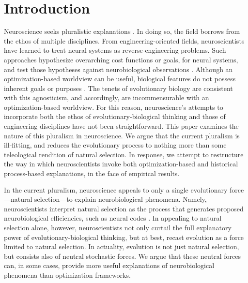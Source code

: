 \documentclass[twocolumn]{article}
\begin{document}

     

\section{Introduction}
Neuroscience seeks pluralistic explanations \cite{mayr_1961, tinbergen_1963, Krakauer:2017ie, hladky_2013}. In doing so, the field borrows from the ethos of multiple disciplines. From engineering-oriented fields, neuroscientists have learned to treat neural systems as reverse-engineering problems. Such approaches hypothesize overarching cost functions or goals, for neural systems, and test those hypotheses against neurobiological observations \cite{marr2010vision, Barlow_1961}.  Although an optimization-based worldview can be useful, biological features do not possess inherent goals or purposes \cite{Gould_Lewontin_1979, mayr_1997, dobzhansky_1973, Lynch_2007}. The tenets of evolutionary biology are consistent with this agnosticism, and accordingly, are incommensurable with an optimization-based worldview. For this reason, neuroscience's attempts to incorporate both the ethos of evolutionary-biological thinking and those of engineering disciplines have not been straightforward. This paper examines the nature of this pluralism in neuroscience. We argue that the current pluralism is ill-fitting, and reduces the evolutionary process to nothing more than some teleological rendition of natural selection. In response, we attempt to restructure the way in which neuroscientists invoke both optimization-based and historical process-based explanations, in the face of empirical results.   

In the current pluralism, neuroscience appeals to only a single evolutionary force---natural selection---to explain neurobiological phenomena. Namely, neuroscientists interpret natural selection as the process that generates proposed neurobiological efficiencies, such as neural codes \cite{Barlow_1961, barlow_2001, simoncelli_olshausen_2001}. In appealing to natural selection alone, however, neuroscientists not only curtail the full explanatory power of evolutionary-biological thinking, but at best, recast evolution as a force limited to natural selection. In actuality, evolution is not just natural selection, but consists also of neutral stochastic forces. We argue that these neutral forces can, in some cases, provide more useful explanations of neurobiological phenomena than optimization frameworks. 
\end{document}
